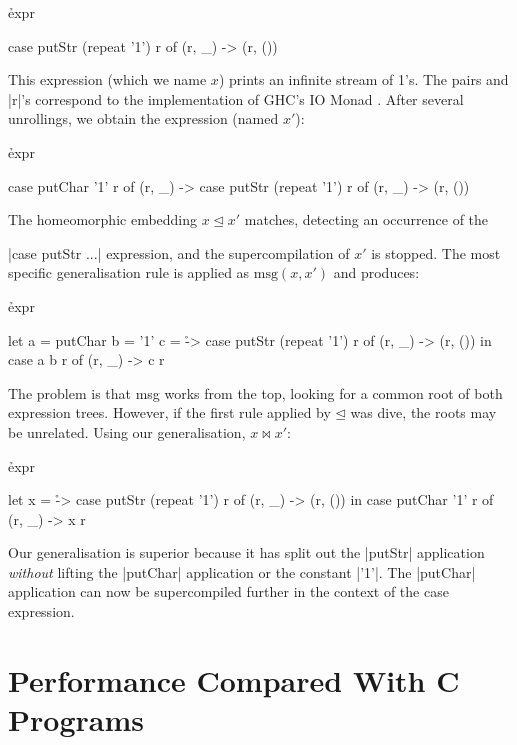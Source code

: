 \begin{example}

\h{expr}\begin{code}
case  putStr (repeat '1') r of
      (r, _) -> (r, ())
\end{code}

This expression (which we name $x$) prints an infinite stream of 1's. The pairs and |r|'s correspond to the implementation of GHC's IO Monad \cite{spj:awkward_squad}. After several unrollings, we obtain the expression (named $x'$):

\h{expr}\begin{code}
case  putChar '1' r of
      (r, _) -> case  putStr (repeat '1') r of
                      (r, _) -> (r, ())
\end{code}

The homeomorphic embedding $x \unlhd x'$ matches, detecting an occurrence of the \ignore|case putStr \? ...| expression, and the supercompilation of $x'$ is stopped. The most specific generalisation rule is applied as $\text{msg}(x,x')$ and produces:

\h{expr}\begin{code}
let  a = putChar
     b = '1'
     c = \r -> case  putStr (repeat '1') r of
                     (r, _) -> (r, ())
in case  a b r of
         (r, _) -> c r
\end{code}

The problem is that msg works from the top, looking for a common root of both expression trees. However, if the first rule applied by $\unlhd$ was dive, the roots may be unrelated. Using our generalisation, $x \bowtie x'$:

\h{expr}\begin{code}
let x = \r -> case  putStr (repeat '1') r of
                    (r, _) -> (r, ())
in case  putChar '1' r of
         (r, _) -> x r
\end{code}

Our generalisation is superior because it has split out the |putStr| application \textit{without} lifting the |putChar| application or the constant |'1'|. The |putChar| application can now be supercompiled further in the context of the case expression.
\end{example}


\section{Performance Compared With C Programs}
\label{secS:c_results}

